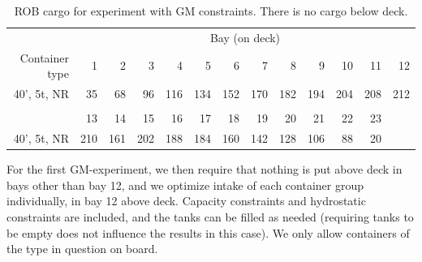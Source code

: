 \begin{table}
\begin{small}
\begin{center}
\begin{tabular}{r|*{12}{r}}
&\multicolumn{12}{c}{Bay (on deck)}\\
Container type&1&2&3&4&5&6&7&8&9&10&11&12\\
\hline
40', 5t, NR & 35&68&96&116&134&152&170&182&194&204&208&212\\
\multicolumn{5}{c}{}\\
&13&14&15&16&17&18&19&20&21&22&23\\
\hline
40', 5t, NR &210&161&202&188&184&160&142&128&106&88&20\\
\end{tabular}
\end{center}
\end{small}
\caption{ROB cargo for experiment with GM constraints. There is no cargo below deck.}\label{tab:ROBGM}
\end{table}

For the first GM-experiment, we then require that nothing is put above deck in bays other than bay 12, and we optimize intake of each container group individually, in bay 12 above deck. Capacity constraints and hydrostatic constraints are included, and the tanks can be filled as needed (requiring tanks to be empty does not influence the results in this case). We only allow containers of the type in question on board. %

